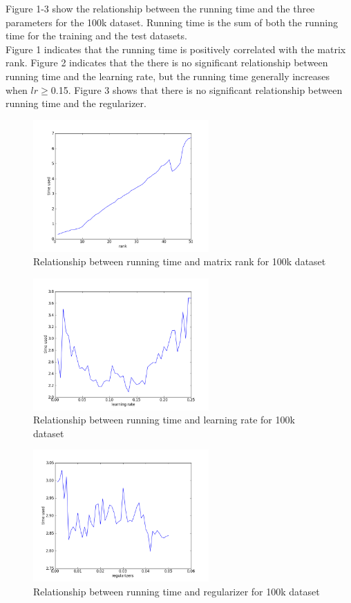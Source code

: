 \documentclass[12pt]{article}
\begin{document}
\noindent Figure 1-3 show the relationship between the running time and the three parameters
for the 100k dataset. Running time is the sum of both the running time for the training and
the test datasets. \\

\noindent Figure 1 indicates that the running time is positively correlated
with the matrix rank. Figure 2 indicates that the there is no significant relationship between
running time and the learning rate, but the running time generally increases when $lr\geq$0.15.
Figure 3 shows that there is no significant relationship between running time and
the regularizer.

\begin{figure}[H]
\centering
\includegraphics[width=0.60\textwidth]{graphs/smalltimerank.png}
\caption{Relationship between running time and matrix rank for 100k dataset}
\end{figure}

\begin{figure}[H]
\centering
\includegraphics[width=0.60\textwidth]{graphs/smalltimelr.png}
\caption{Relationship between running time and learning rate for 100k dataset}
\end{figure}

\begin{figure}[H]
\centering
\includegraphics[width=0.60\textwidth]{graphs/smalltimereg.png}
\caption{Relationship between running time and regularizer for 100k dataset}
\end{figure}
\end{document}

